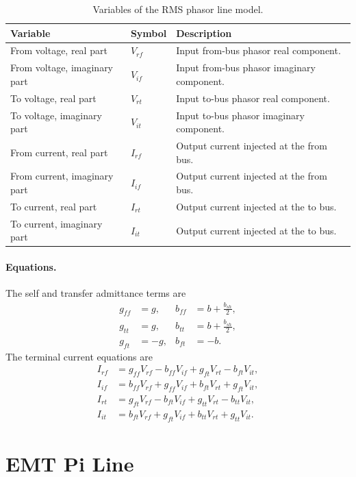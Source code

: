 \begin{table}[h]
\centering
\begin{tabular}{p{}p{}p{}}
\hline
Variable & Symbol & Description \\
\hline
From voltage, real part & $V_{rf}$ & Input from-bus phasor real component. \\
From voltage, imaginary part & $V_{if}$ & Input from-bus phasor imaginary component. \\
To voltage, real part & $V_{rt}$ & Input to-bus phasor real component. \\
To voltage, imaginary part & $V_{it}$ & Input to-bus phasor imaginary component. \\
From current, real part & $I_{rf}$ & Output current injected at the from bus. \\
From current, imaginary part & $I_{if}$ & Output current injected at the from bus. \\
To current, real part & $I_{rt}$ & Output current injected at the to bus. \\
To current, imaginary part & $I_{it}$ & Output current injected at the to bus. \\
\hline
\end{tabular}
\caption{Variables of the RMS phasor line model.}
\end{table}

\paragraph{Equations.}
The self and transfer admittance terms are
\begin{align}
    g_{ff} &= g, &
    b_{ff} &= b+\frac{b_{sh}}{2}, \\
    g_{tt} &= g, &
    b_{tt} &= b+\frac{b_{sh}}{2}, \\
    g_{ft} &= -g, &
    b_{ft} &= -b.
\end{align}
The terminal current equations are
\begin{align}
    I_{rf} &= g_{ff}V_{rf}-b_{ff}V_{if}+g_{ft}V_{rt}-b_{ft}V_{it}, \\
    I_{if} &= b_{ff}V_{rf}+g_{ff}V_{if}+b_{ft}V_{rt}+g_{ft}V_{it}, \\
    I_{rt} &= g_{ft}V_{rf}-b_{ft}V_{if}+g_{tt}V_{rt}-b_{tt}V_{it}, \\
    I_{it} &= b_{ft}V_{rf}+g_{ft}V_{if}+b_{tt}V_{rt}+g_{tt}V_{it}.
\end{align}

\section{EMT Pi Line}

